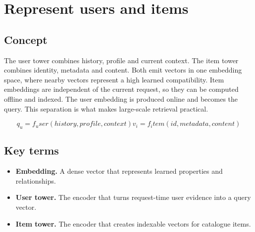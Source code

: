 \section{Represent users and items}

\begin{abstract}
Two encoders translate different evidence into vectors that can be compared.
\end{abstract}

\subsection{Concept}
The user tower combines history, profile and current context. The item tower combines identity, metadata and content. Both emit vectors in one embedding space, where nearby vectors represent a high learned compatibility. Item embeddings are independent of the current request, so they can be computed offline and indexed. The user embedding is produced online and becomes the query. This separation is what makes large-scale retrieval practical.

\begin{equation*}
q_u = f_user(history, profile, context)      v_i = f_item(id, metadata, content)
\end{equation*}

\subsection{Key terms}
\begin{itemize}
\item \textbf{Embedding.} A dense vector that represents learned properties and relationships.
\item \textbf{User tower.} The encoder that turns request-time user evidence into a query vector.
\item \textbf{Item tower.} The encoder that creates indexable vectors for catalogue items.
\end{itemize}

